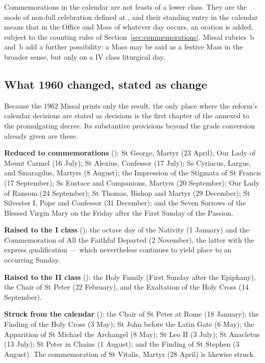 Commemorations in the calendar are not feasts of a lower class. They are the mode of non-full
celebration defined at , and their standing entry in the calendar means that in the Office
and Mass of whatever day occurs, an oration is added, subject to the counting rules of
Section~\ref{sec:commemorations}. Missal rubrics \,b and \,b add a further
possibility: a Mass  may be said as a
festive Mass in the broader sense, but only on a IV class liturgical day.

\subsection{What 1960 changed, stated as change}

Because the 1962 Missal prints only the result, the only place where the reform's calendar
decisions are stated as decisions is the first chapter of the  annexed to the
promulgating decree. Its substantive provisions beyond the grade conversion already given are
these.

\textbf{Reduced to commemorations} (): St George, Martyr (23 April); Our Lady of Mount
Carmel (16 July); St Alexius, Confessor (17 July); Ss Cyriacus, Largus, and Smaragdus, Martyrs
(8 August); the Impression of the Stigmata of St Francis (17 September); Ss Eustace and
Companions, Martyrs (20 September); Our Lady of Ransom (24 September); St Thomas, Bishop and
Martyr (29 December); St Silvester I, Pope and Confessor (31 December); and the Seven Sorrows of
the Blessed Virgin Mary on the Friday after the First Sunday of the Passion.

\textbf{Raised to the I class} (): the octave day of the Nativity (1 January) and the
Commemoration of All the Faithful Departed (2 November), the latter with the express
qualification  — which nevertheless
continues to yield place to an occurring Sunday.

\textbf{Raised to the II class} (): the Holy Family (First Sunday after the Epiphany), the
Chair of St Peter (22 February), and the Exaltation of the Holy Cross (14 September).

\textbf{Struck from the calendar} (): the Chair of St Peter at Rome (18 January); the
Finding of the Holy Cross (3 May); St John before the Latin Gate (6 May); the Apparition of
St Michael the Archangel (8 May); St Leo II (3 July); St Anacletus (13 July); St Peter in Chains
(1 August); and the Finding of St Stephen (3 August). The commemoration of St Vitalis, Martyr
(28 April) is likewise struck.

